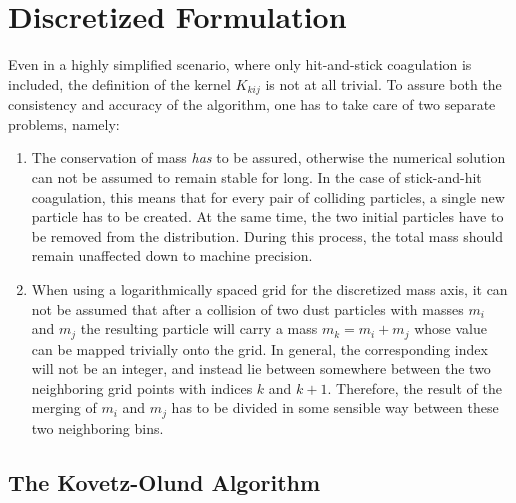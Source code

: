 \section{Discretized Formulation}

    Even in a highly simplified scenario, where only hit-and-stick coagulation is included, the 
    definition of the kernel $K_{kij}$ is not at all trivial. To assure both the consistency and 
    accuracy of the algorithm, one has to take care of two separate problems, namely:
    \begin{enumerate}
        \item The conservation of mass \textit{has} to be assured, otherwise the numerical solution can 
            not be assumed to remain stable for long. In the case of stick-and-hit coagulation, this 
            means that for every pair of colliding particles, a single new particle has to be created. 
            At the same time, the two initial particles have to be removed from the distribution. 
            During this process, the total mass should remain unaffected down to machine precision.
        \item When using a logarithmically spaced grid for the discretized mass axis, it can not be 
            assumed that after a collision of two dust particles with masses $m_i$ and $m_j$ the 
            resulting particle will carry a mass $m_k=m_i+m_j$ whose value can be mapped trivially onto 
            the grid. In general, the corresponding index will not be an integer, and instead lie 
            between somewhere between the two neighboring grid points with indices $k$ and $k+1$.
            Therefore, the result of the merging of $m_i$ and $m_j$ has to be divided in some sensible 
            way between these two neighboring bins.
    \end{enumerate}
    
    \subsection{The Kovetz-Olund Algorithm}
        
